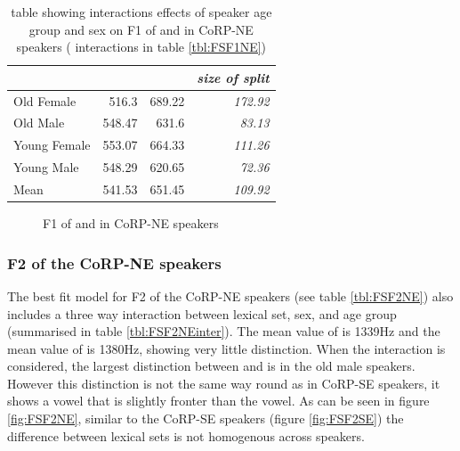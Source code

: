 \documentclass[../../../00.FullDoc/tex/APRReport-year4]{subfiles}
\begin{document}



\begin{table}[htbp]
	\centering
	\begin{tabular}{lrrr}
		\hline
		& \multicolumn{1}{l}{\foot{}} & \multicolumn{1}{l}{\strutt{}} & \multicolumn{1}{l}{\textit{size of split}} \\
		\hline
		Old Female & 516.3 & 689.22 & \textit{172.92} \\
		Old Male & 548.47 & 631.6 & \textit{83.13} \\
		Young Female & 553.07 & 664.33 & \textit{111.26} \\
		Young Male & 548.29 & 620.65 & \textit{72.36} \\
		Mean  & 541.53 & 651.45 & \textit{109.92} \\
		\hline
	\end{tabular}%
	\caption{table showing interactions effects of speaker age group and sex on F1 of \foot{} and \strutt{} in CoRP-NE speakers ( interactions in table \ref{tbl:FSF1NE})}
	\label{tbl:FSF1NEinter}%
\end{table}%

\begin{figure}[h]
	
	\caption{F1 of \foot{} and \strutt{} in CoRP-NE speakers} \label{fig:FSF1NE}
\end{figure}


\subsubsection{F2 of the CoRP-NE speakers} \label{subsubsec:NEF2}
The best fit model for F2 of the CoRP-NE speakers (see table \ref{tbl:FSF2NE}) also includes a three way interaction between lexical set, sex, and age group (summarised in table \ref{tbl:FSF2NEinter}). The mean value of \foot{} is 1339Hz and the mean value of \strutt{} is 1380Hz, showing very little distinction. When the interaction is considered, the largest distinction between \foot{} and \strutt is in the old male speakers. However this distinction is not the same way round as in CoRP-SE speakers, it shows a \strutt{} vowel that is slightly fronter than the \foot{} vowel.
As can be seen in figure \ref{fig:FSF2NE}, similar to the CoRP-SE speakers (figure \ref{fig:FSF2SE}) the difference between lexical sets is not homogenous across speakers.


\end{document}
